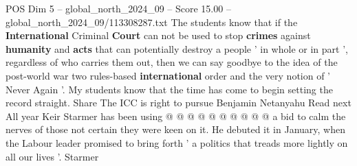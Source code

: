\begin{textsample}{POS Dim 5 – global\_north\_2024\_09 – Score 15.00 – global\_north\_2024\_09/113308287.txt}
The students know that if the \textbf{International} Criminal \textbf{Court} can not be used to stop \textbf{crimes} against \textbf{humanity} and \textbf{acts} that can potentially destroy a people ' in whole or in part ', regardless of who carries them out, then we can say goodbye to the idea of the post-world war two rules-based \textbf{international} order and the very notion of ' Never Again '.
My students know that the time has come to begin setting the record straight.
Share The ICC is right to pursue Benjamin Netanyahu Read next All year Keir Starmer has been using @ @ @ @ @ @ @ @ @ @ a bid to calm the nerves of those not certain they were keen on it.
He debuted it in January, when the Labour leader promised to bring forth ' a politics that treads more lightly on all our lives '.
Starmer

\end{textsample}
